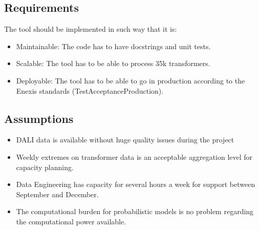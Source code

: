 \documentclass[letterpaper,10pt,english]{sphinxmanual}
\begin{document}
\subsection{Requirements}
\label{\detokenize{business_understanding:requirements}}
The tool should be implemented in such way that it is:
\begin{itemize}
\item {} 
Maintainable: The code has to have docstrings and unit tests.

\item {} 
Scalable: The tool has to be able to process 35k transformers.

\item {} 
Deployable: The tool has to be able to go in production according to the Enexis standards (Test\sphinxhyphen{}Acceptance\sphinxhyphen{}Production).

\end{itemize}


\subsection{Assumptions}
\label{\detokenize{business_understanding:assumptions}}\begin{itemize}
\item {} 
DALI data is available without huge quality issues during the project

\item {} 
Weekly extremes on transformer data is an acceptable aggregation level for capacity planning.

\item {} 
Data Engineering has capacity for several hours a week for support between September and December.

\item {} 
The computational burden for probabilistic models is no problem regarding the computational power available.

\end{itemize}
\end{document}
